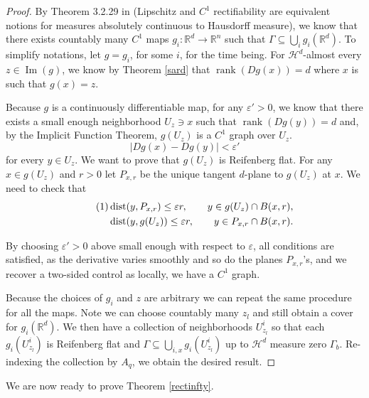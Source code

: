 \documentclass[11pt, twoside, leqno]{article}
\numberwithin{equation}{section}
\newcommand\numberthis{\addtocounter{equation}{1}\tag{\theequation}}
\theoremstyle{plain}
\theoremstyle{definition}
\newcommand{\R}{\mathbb{R}}
\renewcommand{\Im}{\operatorname{Im}} %
\newcommand{\e}{\varepsilon} %
\newcommand{\dist}{\operatorname{dist}}
\begin{document}
\begin{proof}
By Theorem 3.2.29 in \cite{federer} (Lipschitz and $C^1$ rectifiability are equivalent notions for measures absolutely continuous to Hausdorff measure), we know that there exists countably many $C^1$ maps $g_i \colon \R^d \to \R^n$ such that $\Gamma \subseteq \bigcup_i g_i(\R^d)$. 
To simplify notations, let $g=g_i$, for some $i$, for the time being. For $\mathcal{H}^d$-almost every $z \in \Im(g)$, we know by Theorem \ref{sard} that $\operatorname{rank}(Dg(x))=d$ where $x$ is such that $g(x)=z$. 

Because $g$ is a continuously differentiable map, for any $\e'>0$, we know that there exists a small enough neighborhood $U_z \ni x$ such that $\operatorname{rank}(Dg(y))=d$ and, by the Implicit Function Theorem, $g(U_z)$ is a $C^1$ graph over $U_z$.
\begin{equation}
    |Dg(x)-Dg(y)| < \e'
\end{equation}
for every $y \in U_z$. We want to prove that $g(U_z)$ is Reifenberg flat. 
For any $x \in g(U_z)$ and $r>0$ let $P_{x,r}$ be the unique tangent $d$-plane to $g(U_z)$ at $x$. %
We need to check that  
\begin{align*} \numberthis
& \dist(y, P_{x,r}) \leq \e r, \qquad y \in g(U_z) \cap B(x,r), \\
&  \dist(y, g(U_z)) \leq \e r, \qquad y \in P_{x,r} \cap B(x,r).
\end{align*}

By choosing $\e'>0$ above small enough with respect to $\e$, all conditions are satisfied, as the derivative varies smoothly and so do the planes $P_{x,r}$'s, and we recover a two-sided control as locally, we have a $C^1$ graph.

Because the choices of $g_i$ and $z$ are arbitrary we can repeat the same procedure for all the maps. Note we can choose countably many $z_l$ and still obtain a cover for $g_i(\R^d)$. We then have a collection of neighborhoods $U_{z_l}^i$ so that each $g_i(U_{z_l}^i)$ is Reifenberg flat and $\Gamma \subseteq \bigcup_{i,x} g_i(U_{z_l}^i)$ up to $\mathcal{H}^d$ measure zero $\Gamma_b$. Re-indexing the collection by $A_q$, we obtain the desired result.
\end{proof}

We are now ready to prove Theorem \ref{rectinfty}.
\end{document}
